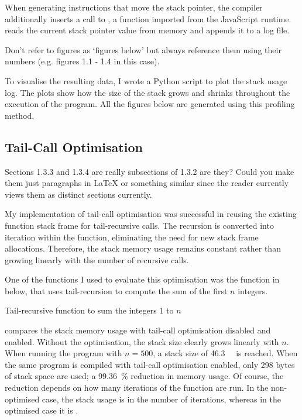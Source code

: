 \documentclass[00-main.tex]{subfiles}
\begin{document}
When generating instructions that move the stack pointer, the compiler additionally inserts a call to , a function imported from the JavaScript runtime.
 reads the current stack pointer value from memory and appends it to a log file.

\begin{Comment}
Don't refer to figures as `figures below' but always
reference them using their numbers (e.g. figures 1.1 - 1.4 in this case).
\end{Comment}

To visualise the resulting data, I wrote a Python script to plot the stack usage log.
The plots show how the size of the stack grows and shrinks throughout the execution of the program.
All the figures below are generated using this profiling method.




\subsection{Tail-Call Optimisation}

\begin{Comment}
Sections 1.3.3 and 1.3.4 are really subsections of 1.3.2 are they?
Could you make them just paragraphs in LaTeX or something similar since
the reader currently views them as distinct sections currently.
\end{Comment}

My implementation of tail-call optimisation was successful in reusing the existing function stack frame for tail-recursive calls. The recursion is converted into iteration within the function, eliminating the need for new stack frame allocations.
Therefore, the stack memory usage remains constant rather than growing linearly with the number of recursive calls.

One of the functions I used to evaluate this optimisation was the function in  below, that uses tail-recursion to compute the sum of the first $n$ integers.

\begin{listing}[ht]
  \caption{Tail-recursive function to sum the integers 1 to $n$}
  \label{lst:tail-recursive sum}
\end{listing}


 compares the stack memory usage with tail-call optimisation disabled and enabled.
Without the optimisation, the stack size clearly grows linearly with $n$.
When running the program with $n=500$, a stack size of \SI{46.3}{\kilo\byte} is reached.
When the same program is compiled with tail-call optimisation enabled, only 298 bytes of stack space are used; a \SI{99.36}{\percent} reduction in memory usage.
Of course, the reduction depends on how many iterations of the function are run.
In the non-optimised case, the stack usage is  in the number of iterations, whereas in the optimised case it is .
\end{document}
